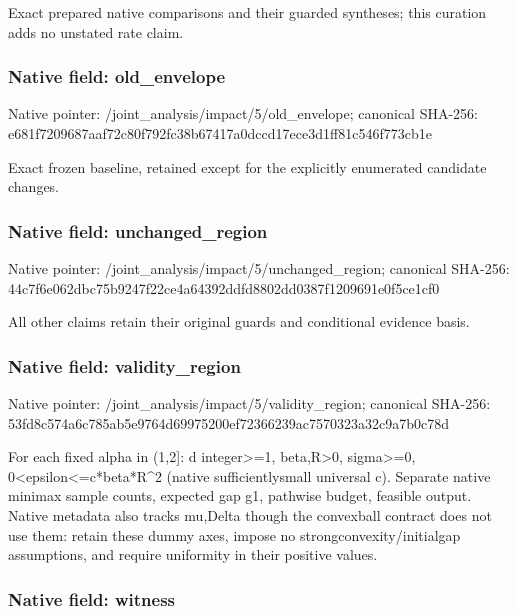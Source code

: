 \documentclass[10pt,a4paper]{article}
\begin{document}
Exact prepared native comparisons and their guarded syntheses; this curation adds no unstated rate claim.


\subsubsection{Native field: old\_envelope}


Native pointer: /joint\_analysis/impact/5/old\_envelope; canonical SHA-256: e681f7209687aaf72c80f792\allowbreak{}fc38b67417a0dccd17ece3d1\allowbreak{}ff81c546f773cb1e


Exact frozen baseline, retained except for the explicitly enumerated candidate changes.


\subsubsection{Native field: unchanged\_region}


Native pointer: /joint\_analysis/impact/5\allowbreak{}/unchanged\_region; canonical SHA-256: 44c7f6e062dbc75b9247f22c\allowbreak{}e4a64392ddfd8802dd0387f1\allowbreak{}209691e0f5ce1cf0


All other claims retain their original guards and conditional evidence basis.


\subsubsection{Native field: validity\_region}


Native pointer: /joint\_analysis/impact/5\allowbreak{}/validity\_region; canonical SHA-256: 53fd8c574a6c785ab5e9764d\allowbreak{}69975200ef72366239ac7570\allowbreak{}323a32c9a7b0c78d


For each fixed alpha in (1,2]: d integer>=1, beta,R>0, sigma>=0, 0<epsilon<=c*beta*R\textasciicircum{}2 (native sufficientlysmall universal c). Separate native minimax sample counts, expected gap g1, pathwise budget, feasible output. Native metadata also tracks mu,Delta though the convexball contract does not use them: retain these dummy axes, impose no strongconvexity/initialgap assumptions, and require uniformity in their positive values.


\subsubsection{Native field: witness}
\end{document}
